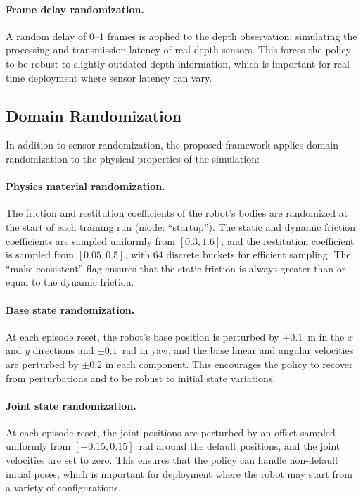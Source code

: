 \paragraph{Frame delay randomization.}
A random delay of 0--1 frames is applied to the depth observation, simulating the processing and transmission latency of real depth sensors. This forces the policy to be robust to slightly outdated depth information, which is important for real-time deployment where sensor latency can vary.

\subsection{Domain Randomization}
\label{sec:domain_randomization}

In addition to sensor randomization, the proposed framework applies domain randomization to the physical properties of the simulation:

\paragraph{Physics material randomization.}
The friction and restitution coefficients of the robot's bodies are randomized at the start of each training run (mode: ``startup''). The static and dynamic friction coefficients are sampled uniformly from $[0.3, 1.6]$, and the restitution coefficient is sampled from $[0.05, 0.5]$, with 64 discrete buckets for efficient sampling. The ``make consistent'' flag ensures that the static friction is always greater than or equal to the dynamic friction.

\paragraph{Base state randomization.}
At each episode reset, the robot's base position is perturbed by $\pm 0.1$~m in the $x$ and $y$ directions and $\pm 0.1$~rad in yaw, and the base linear and angular velocities are perturbed by $\pm 0.2$ in each component. This encourages the policy to recover from perturbations and to be robust to initial state variations.

\paragraph{Joint state randomization.}
At each episode reset, the joint positions are perturbed by an offset sampled uniformly from $[-0.15, 0.15]$~rad around the default positions, and the joint velocities are set to zero. This ensures that the policy can handle non-default initial poses, which is important for deployment where the robot may start from a variety of configurations.

